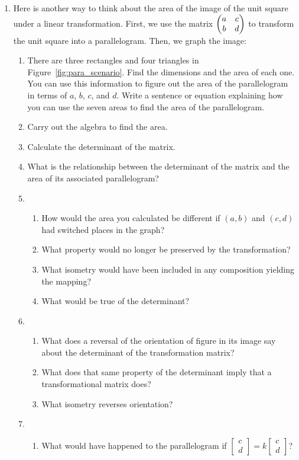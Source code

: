 \documentclass[../gatm_answers.tex]{subfiles}
\begin{document}
\begin{enumerate}
\item Here is another way to think about the area of the image of the unit square under a linear transformation. First, we use the matrix $\begin{pmatrix} a & c \\ b & d \end{pmatrix}$ to transform the unit square into a parallelogram. Then, we graph the image: \label{prob:unit_square_into_parallelogram}
\begin{enumerate}
\item There are three rectangles and four triangles in Figure~\ref{fig:para_scenario}. Find the dimensions and the area of each one. You can use this information to figure out the area of the parallelogram in terms of $a$, $b$, $c$, and $d$. Write a sentence or equation explaining how you can use the seven areas to find the area of the parallelogram.
\item Carry out the algebra to find the area.
\item Calculate the determinant of the matrix.
\item What is the relationship between the determinant of the matrix and the area of its associated parallelogram?
\item \begin{enumerate}
\item How would the area you calculated be different if $(a,b)$ and $(c,d)$ had switched places in the graph?
\item What property would no longer be preserved by the transformation?
\item What isometry would have been included in any composition yielding the mapping?
\item What would be true of the determinant?
\end{enumerate}
\item \begin{enumerate}
\item What does a reversal of the orientation of figure in its image say about the determinant of the transformation matrix?
\item What does that same property of the determinant imply that a transformational matrix does?
\item What isometry reverses orientation?
\end{enumerate}
\item \begin{enumerate}
\item What would have happened to the parallelogram if $\left[\begin{smallmatrix}c \\ d \end{smallmatrix}\right]=k\left[\begin{smallmatrix}c \\ d \end{smallmatrix}\right]$?

\end{enumerate}
\end{enumerate}
\end{enumerate}
\end{document}
